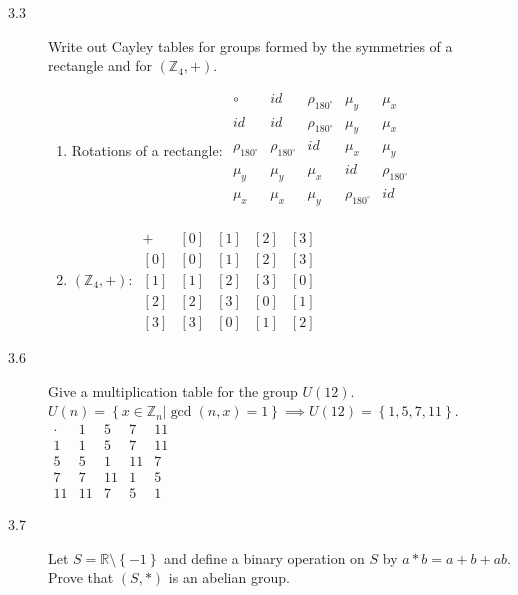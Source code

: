 \documentclass{article}
\newcommand{\Z}{\mathbb{Z}}
\begin{document}
\begin{description}
		\item[3.3] Write out Cayley tables for groups formed by the symmetries of a rectangle and for $\left(\Z_4,+\right)$. 
		\begin{enumerate}
			\item Rotations of a rectangle:
			$\begin{array}{c|cccc}
				\circ&  id&  \rho_{180^\circ}&  \mu_y&  \mu_x\\ 
				\hline 
				id&  id&  \rho_{180^\circ}&  \mu_y&  \mu_x\\ 
				 
				\rho_{180^\circ}&  \rho_{180^\circ}&  id&  \mu_x&  \mu_y\\ 
				 
				\mu_y&  \mu_y&  \mu_x&  id&  \rho_{180^\circ}\\ 
				 
				\mu_x&  \mu_x&  \mu_y&  \rho_{180^\circ}&  id\\
				 
			\end{array}$
			
			\item $\left(\Z_4,+\right)$:
			$\begin{array}{c|cccc}
			+&	[0]&  [1]&  [2]&  [3]\\ 
			\hline
			[0]&  [0]&	[1]&  [2]&  [3]\\ 
			\left[1\right]&  [1]&  [2]&  [3]&  [0]\\ 
			\left[2\right]&  [2]&  [3]&  [0]&  [1]\\ 
			\left[3\right]&  [3]&  [0]&  [1]&  [2]
			\end{array} $
		\end{enumerate}
		
		\item[3.6] Give a multiplication table for the group $U(12)$. \\
		$U(n)=\left\{x\in\Z_n|\gcd(n,x)=1\right\}\implies U(12)=\left\{1,5,7,11\right\}$.\\
		$\begin{array}{c|cccc}
			\cdot&  1&  5&  7&  11\\ 
			\hline
			1&  1&  5&  7&  11\\ 
			5&  5&  1&  11&  7\\ 
			7&  7&  11&  1&  5\\ 
			11&  11&  7&  5&  1
		\end{array} $
		
		\item[3.7] Let $S=\mathbb{R}\setminus\left\{-1\right\}$ and define a binary operation on $S$ by $a\ast b=a+b+ab$. Prove that $\left(S,\ast\right)$ is an abelian group.
		

\end{description}
\end{document}
